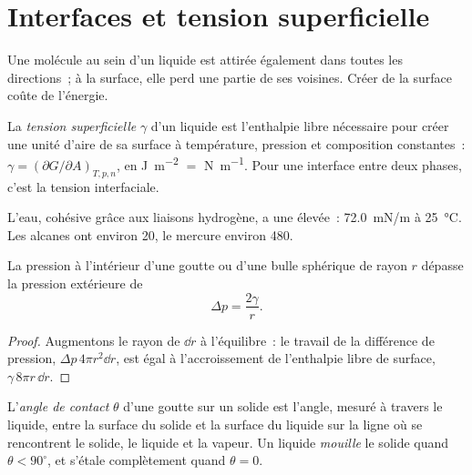 \section{Interfaces et tension superficielle}

Une molécule au sein d'un liquide est attirée également dans toutes les
directions~; à la surface, elle perd une partie de ses voisines. Créer de
la surface coûte de l'énergie.

\begin{definition}\label{def:b3:colloids:surface-tension}
La \emph{tension superficielle} $\gamma$ d'un
liquide est l'enthalpie libre nécessaire pour créer une unité d'aire de
sa surface à température, pression et composition constantes~:
$\gamma = (\partial G/\partial A)_{T,p,n}$, en \unit{J.m^{-2}} $=$ \unit{N.m^{-1}}.
Pour une interface entre deux phases, c'est la tension interfaciale.
\end{definition}

L'eau, cohésive grâce aux liaisons hydrogène, a une 
élevée~: \qty{72.0}{mN/m}
à \qty{25}{\celsius}. Les alcanes ont environ 20, le mercure environ 480.

\begin{proposition}\label{prop:b3:colloids:laplace}
La pression à l'intérieur d'une goutte ou d'une bulle sphérique de rayon
$r$ dépasse la pression extérieure de
\[
  \Delta p = \frac{2\gamma}{r} .
\]
\end{proposition}

\begin{proof}
Augmentons le rayon de $\dd r$ à l'équilibre~: le travail de la
différence de pression, $\Delta p\,4\pi r^2\dd r$, est égal à
l'accroissement de l'enthalpie libre de surface, $\gamma\,8\pi r\,\dd r$.
\end{proof}

\begin{definition}\label{def:b3:colloids:wetting}
L'\emph{angle de contact} $\theta$ d'une goutte
sur un solide est l'angle, mesuré à travers le liquide, entre la surface
du solide et la surface du liquide sur la ligne où se rencontrent le
solide, le liquide et la vapeur. Un liquide \emph{mouille}
le solide quand $\theta < 90^\circ$, et s'étale complètement quand
$\theta = 0$.
\end{definition}

